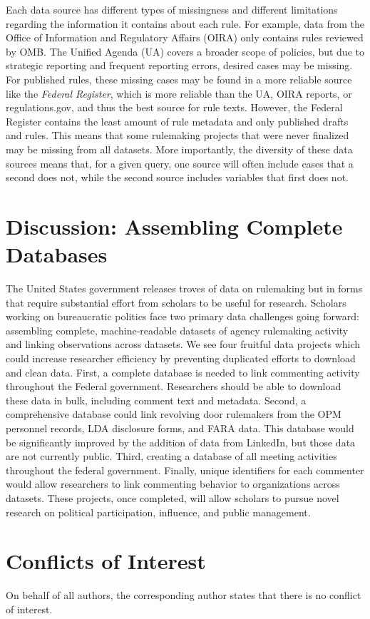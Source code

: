 \documentclass[
      12pt,
        ]{article}
\begin{document}
Each data source has different types of missingness and different
limitations regarding the information it contains about each rule. For
example, data from the Office of Information and Regulatory Affairs
(OIRA) only contains rules reviewed by OMB. The Unified Agenda (UA)
covers a broader scope of policies, but due to strategic reporting and
frequent reporting errors, desired cases may be missing. For published
rules, these missing cases may be found in a more reliable source like
the \emph{Federal Register}, which is more reliable than the UA, OIRA
reports, or regulations.gov, and thus the best source for rule texts.
However, the Federal Register contains the least amount of rule metadata
and only published drafts and rules. This means that some rulemaking
projects that were never finalized may be missing from all datasets.
More importantly, the diversity of these data sources means that, for a
given query, one source will often include cases that a second does not,
while the second source includes variables that first does not.

\hypertarget{discussion-assembling-complete-databases}{%
\section{Discussion: Assembling Complete
Databases}\label{discussion-assembling-complete-databases}}

The United States government releases troves of data on rulemaking but
in forms that require substantial effort from scholars to be useful for
research. Scholars working on bureaucratic politics face two primary
data challenges going forward: assembling complete, machine-readable
datasets of agency rulemaking activity and linking observations across
datasets. We see four fruitful data projects which could increase
researcher efficiency by preventing duplicated efforts to download and
clean data. First, a complete database is needed to link commenting
activity throughout the Federal government. Researchers should be able
to download these data in bulk, including comment text and metadata.
Second, a comprehensive database could link revolving door rulemakers
from the OPM personnel records, LDA disclosure forms, and FARA data.
This database would be significantly improved by the addition of data
from LinkedIn, but those data are not currently public. Third, creating
a database of all meeting activities throughout the federal government.
Finally, unique identifiers for each commenter would allow researchers
to link commenting behavior to organizations across datasets. These
projects, once completed, will allow scholars to pursue novel research
on political participation, influence, and public management.

\hypertarget{conflicts-of-interest}{%
\section{Conflicts of Interest}\label{conflicts-of-interest}}

On behalf of all authors, the corresponding author states that there is
no conflict of interest.
  \newpage
  \theendnotes
\newpage
\singlespacing
          
  
\end{document}
